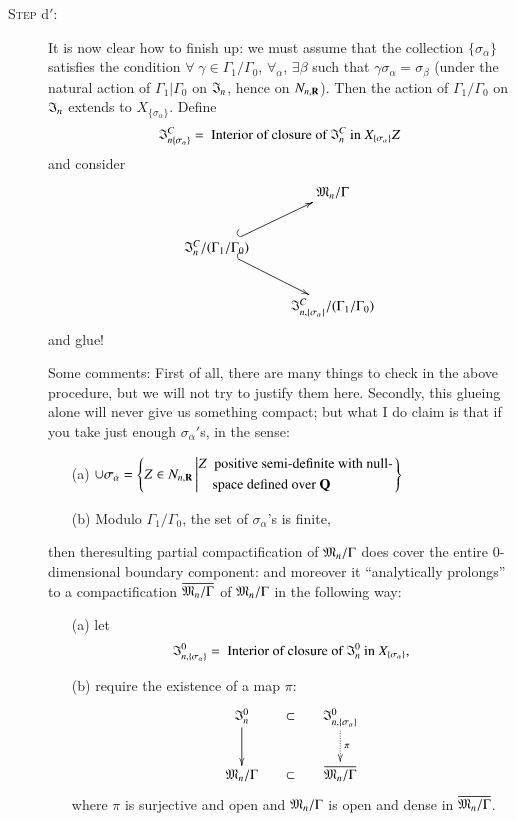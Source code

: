 \begin{description}
\item[\textsc{Step} d$'$:] It is now clear how to finish up: we must assume that the collection $\{\sigma_\alpha\}$ satisfies the condition $\forall \; \gamma \in \Gamma_1 / \Gamma_0$, $\forall_\alpha$, $\exists \beta$ such that $\gamma \sigma_\alpha = \sigma_\beta$ (under the natural action of $\Gamma_1 | \Gamma_0$ on $\mathfrak{I}_n$, hence on $N_{n,\mathbf{R}}$). Then the action of $\Gamma_1 / \Gamma_0$ on $\mathfrak{I}_n$ extends to $X_{\{\sigma_\alpha\}}$. Define
$$
\mathfrak{I}^C_{n \{\sigma_\alpha\}} = \text{ Interior of closure of } \mathfrak{I}^C_n \text{ in } X_{\{\sigma_{\alpha}\}} Z
$$
and consider
$$
\xymatrix{
& \fM_n/ \Gamma \\
\fI^C_n / (\Gamma_1 / \Gamma_0) \ar@{^{(}->}[ur]  \ar@{^{(}->}[dr] & \\
& \fI^C_{n, \{\sigma_\alpha\}} / (\Gamma_1/ \Gamma_0)
}
$$
and glue!

Some comments: First of all, there are many things to check in the above procedure, but we will not try to justify them here. Secondly, this glueing alone will never give us something compact;  but what I do claim is that if you take just enough $\sigma_\alpha'$s, in the sense:
\begin{itemize}
\item[(a)] $\cup \sigma_\alpha = \left\{ Z \in N_{n, \mathbf{R}} \left|
\begin{aligned}
& Z \; \text{ positive semi-definite with null-}\\
& \quad \text{space defined over } \mathbf{Q}
\end{aligned}
\right.
\right\}$

\item[(b)] Modulo $\Gamma_1/ \Gamma_0$, the set of $\sigma_\alpha$'s is finite,
\end{itemize} 
then the\pageoriginale resulting partial compactification of $\mathfrak{M}_n/\Gamma$ does cover the entire 0-dimensional boundary component: and moreover it ``analytically prolongs'' to a compactification $\overline{\mathfrak{M}_n/ \Gamma}$ of $\mathfrak{M}_n/\Gamma$  in the following way:
\begin{itemize}
\item[(a)] let 
$$
\mathfrak{I}^0_{n, \{\sigma_\alpha\}} = \text{ Interior of closure of } \mathfrak{I}^0_n \text{ in } X_{\{\sigma_\alpha\}},
$$

\item[(b)] require the existence of a map $\pi$:
$$
\xymatrix@C=0.5cm{
\fI^0_n \ar[d] & \subset &  \fI^0_{n, \{\sigma_\alpha\}} \ar@{..>}[d]^-{\pi}\\
\fM_n/\Gamma & \subset & \overline{\fM_n/\Gamma}
}
$$
where $\pi$ is surjective and open and $\mathfrak{M}_n/\Gamma$ is open and dense in $\overline{\mathfrak{M}_n/\Gamma}$.


\end{itemize}
\end{description}
